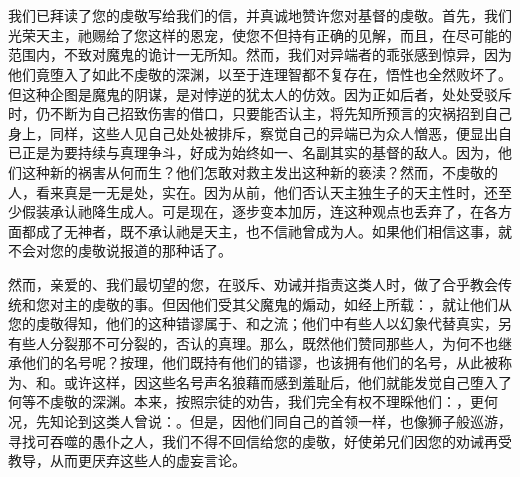 \section{}

\par

我们已拜读了您的虔敬写给我们的信，并真诚地赞许您对基督的虔敬。首先，我们光荣天主，祂赐给了您这样的恩宠，使您不但持有正确的见解，而且，在尽可能的范围内，不致对魔鬼的诡计一无所知。然而，我们对异端者的乖张感到惊异，因为他们竟堕入了如此不虔敬的深渊，以至于连理智都不复存在，悟性也全然败坏了。但这种企图是魔鬼的阴谋，是对悖逆的犹太人的仿效。因为正如后者，处处受驳斥时，仍不断为自己招致伤害的借口，只要能否认主，将先知所预言的灾祸招到自己身上，同样，这些人见自己处处被排斥，察觉自己的异端已为众人憎恶，便显出自已正是为要持续与真理争斗，好成为始终如一、名副其实的基督的敌人。因为，他们这种新的祸害从何而生？他们怎敢对救主发出这种新的亵渎？然而，不虔敬的人，看来真是一无是处，实在。因为从前，他们否认天主独生子的天主性时，还至少假装承认祂降生成人。可是现在，逐步变本加厉，连这种观点也丢弃了，在各方面都成了无神者，既不承认祂是天主，也不信祂曾成为人。如果他们相信这事，就不会对您的虔敬说报道的那种话了。\par

然而，亲爱的、我们最切望的您，在驳斥、劝诫并指责这类人时，做了合乎教会传统和您对主的虔敬的事。但因他们受其父魔鬼的煽动，如经上所载：，就让他们从您的虔敬得知，他们的这种错谬属于、和之流；他们中有些人以幻象代替真实，另有些人分裂那不可分裂的，否认的真理。那么，既然他们赞同那些人，为何不也继承他们的名号呢？按理，他们既持有他们的错谬，也该拥有他们的名号，从此被称为、和。或许这样，因这些名号声名狼藉而感到羞耻后，他们就能发觉自己堕入了何等不虔敬的深渊。本来，按照宗徒的劝告，我们完全有权不理睬他们：，更何况，先知论到这类人曾说：。但是，因他们同自己的首领一样，也像狮子般巡游，寻找可吞噬的愚仆之人，我们不得不回信给您的虔敬，好使弟兄们因您的劝诫再受教导，从而更厌弃这些人的虚妄言论。\par

